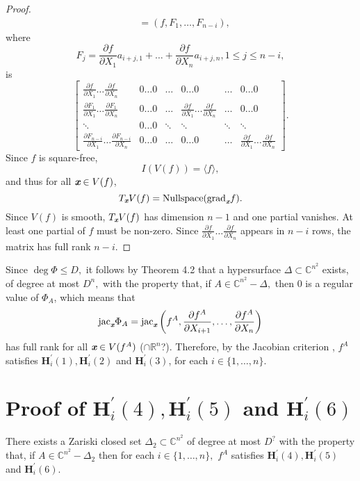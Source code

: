 \documentclass[sigconf]{acmart}
\def\xb{\textit{\textbf{x}}}
\def\C{\mathbb{C}}
\def\R{\mathbb{R}}
\def\jac{ \textrm{jac}}
\def\grad{\textrm{grad}}
\def\pa{\partial}
\begin{document}
\begin{proof}
\begin{align*}
&= (f,F_{1},\hdots,F_{n-i}),  
\end{align*} 
%
where 
\[
F_j = \frac{\pa f}{\pa X_1} a_{i+j,1} + \hdots + \frac{\pa f}{\pa X_n}a_{i+j,n}, 1 \leq j \leq n-i,\]
is
\[
\left[ 
\begin{array}{cccccc}
\frac{\pa f}{\pa X_1} \hdots \frac{\pa f}{\pa X_n}            &0\hdots 0&\hdots& 0 \hdots 0                                         & \hdots & 0\hdots 0 \\ 
\frac{\pa F_{1}}{\pa X_1}\hdots \frac{\pa F_{1}}{\pa X_n}     &0\hdots 0&\hdots& \frac{\pa f}{\pa X_1} \hdots \frac{\pa f}{\pa X_n} & \hdots & 0\hdots 0 \\
\ddots                                                        &0\hdots 0&\ddots&\ddots                                              & \ddots & \ddots \\
\frac{\pa F_{n-i}}{\pa X_1}\hdots \frac{\pa F_{n-i}}{\pa X_n} &0\hdots 0&\hdots&0 \hdots 0&  \hdots & \frac{\pa f}{\pa X_1} \hdots \frac{\pa f}{\pa X_n}  
\end{array}
\right]. 
\] 
Since $f$ is square-free, \[I(V(f)) = \langle f \rangle,\]  and thus for all $\xb \in V(f)$, 
\[
T_{\xb} V(f) = \textrm{Nullspace}(\grad_{\xb} f).
\]
Since $V(f)$ is smooth, $T_{\xb} V(f)$ has dimension $n-1$ and one partial vanishes. At least one partial of $f$ must be non-zero. Since  $\frac{\pa f}{\pa X_1} \hdots \frac{\pa f}{\pa X_n}$ appears in $n-i$ rows, the matrix has full rank $n-i$.
\end{proof}
%
Since $\deg \Phi \leq D,$ it follows by Theorem 4.2 that a hypersurface $\Delta \subset \C^{n^2}$ exists, of degree at most $D^n,$ with the property that, if $A \in \C^{n^2}-\Delta,$ then $0$ is a regular value of $\Phi_{A}$, which means that 
\[
\jac_\textit{\textbf{x}} \Phi_A 
= \jac_\xb \left(f^A,\frac{\pa f^A}{\pa X_{i+1}},\hdots,\frac{\pa f^A}{\pa X_n}\right)
\] 
has full rank for all $\xb \in V(f^A)$ ($\cap \R^n$?). Therefore, by the Jacobian criterion \cite[Theorem 16.19]{ECA}, $f^A$ satisfies $\textbf{H}_i^{'}(1),\textbf{H}_i^{'}(2)$ and $\textbf{H}_i^{'}(3)$, for each $i \in \{1,\hdots,n\}.$
%
%
%
%
\section{Proof of $\textbf{H}_i^{'}(4),\textbf{H}_i^{'}(5)$ and $\textbf{H}_i^{'}(6)$}
%
\begin{theorem}
There exists a Zariski closed set $\Delta_2 \subset \C^{n^2}$ of degree at most $D^{\textrm{?}}$ with the property that, if $A \in \C^{n^2} - \Delta_2$ then for each $i \in \{1,\hdots,n\},$ $f^A$ satisfies $\textbf{H}_i^{'}(4),\textbf{H}_i^{'}(5)$ and $\textbf{H}_i^{'}(6)$.
\end{theorem}
%
\end{document}
